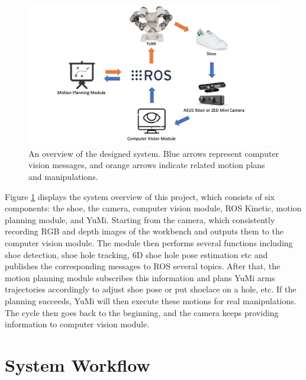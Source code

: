 \begin{figure}[H]
\centering
\includegraphics[width = \columnwidth]{AnalysisDesign/system.png}
\caption{An overview of the designed system. Blue arrows represent computer vision messages, and orange arrows indicate related motion plans and manipulations.}
\label{c4}
\end{figure}

Figure \ref{c4} displays the system overview of this project, which consists of six components: the shoe, the camera, computer vision module, ROS Kinetic, motion planning module, and YuMi. Starting from the camera, which consistently recording RGB and depth images of the workbench and outputs them to the computer vision module. The module then performs several functions including shoe detection, shoe hole tracking, 6D shoe hole pose estimation etc and publishes the corresponding messages to ROS several topics. After that, the motion planning module subscribes this information and plans YuMi arms trajectories accordingly to adjust shoe pose or put shoelace on a hole, etc. If the planning succeeds, YuMi will then execute these motions for real manipulations. The cycle then goes back to the beginning, and the camera keeps providing information to computer vision module.

\section{System Workflow}

